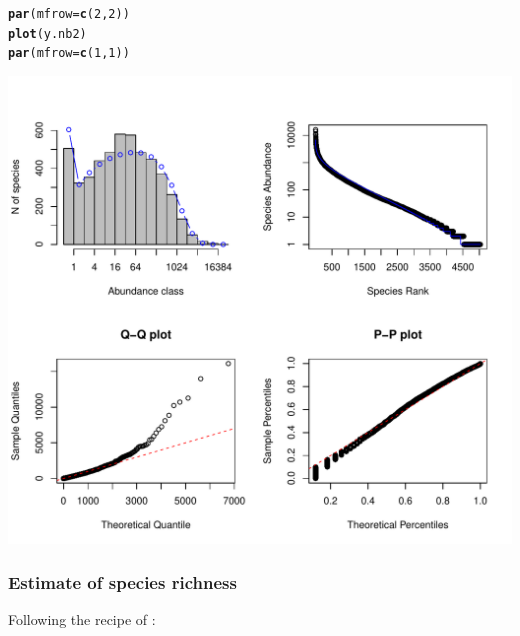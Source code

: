 \documentclass[12pt, A4]{article}\usepackage[]{graphicx}\usepackage[]{color}
\makeatletter
\def\maxwidth{ %
  \ifdim\Gin@nat@width>\linewidth
    \linewidth
  \else
    \Gin@nat@width
  \fi
}
\newcommand{\hlnum}[1]{\textcolor[rgb]{0.686,0.059,0.569}{#1}}%
\newcommand{\hlstd}[1]{\textcolor[rgb]{0.345,0.345,0.345}{#1}}%
\newcommand{\hlkwc}[1]{\textcolor[rgb]{0.333,0.667,0.333}{#1}}%
\newcommand{\hlkwd}[1]{\textcolor[rgb]{0.737,0.353,0.396}{\textbf{#1}}}%
\newenvironment{kframe}{%
 \def\at@end@of@kframe{}%
 \ifinner\ifhmode%
  \def\at@end@of@kframe{\end{minipage}}%
  \begin{minipage}{\columnwidth}%
 \fi\fi%
 \def\FrameCommand##1{\hskip\@totalleftmargin \hskip-\fboxsep
 \colorbox{shadecolor}{##1}\hskip-\fboxsep
     \hskip-\linewidth \hskip-\@totalleftmargin \hskip\columnwidth}%
 \MakeFramed {\advance\hsize-\width
   \@totalleftmargin\z@ \linewidth\hsize
   \@setminipage}}%
 {\par\unskip\endMakeFramed%
 \at@end@of@kframe}
\newenvironment{knitrout}{}{} %
\makeatother
\begin{document}
\begin{knitrout}
\color{fgcolor}\begin{kframe}
\begin{alltt}
\hlkwd{par}\hlstd{(}\hlkwc{mfrow}\hlstd{=}\hlkwd{c}\hlstd{(}\hlnum{2}\hlstd{,}\hlnum{2}\hlstd{))}
\hlkwd{plot}\hlstd{(y.nb2)}
\hlkwd{par}\hlstd{(}\hlkwc{mfrow}\hlstd{=}\hlkwd{c}\hlstd{(}\hlnum{1}\hlstd{,}\hlnum{1}\hlstd{))}
\end{alltt}
\end{kframe}

{\centering \includegraphics[width=\maxwidth]{figure/nb_plots-1} 

}



\end{knitrout}


\subsubsection*{Estimate of  species richness}

Following the recipe of \citet{tovo2017}:
\end{document}
